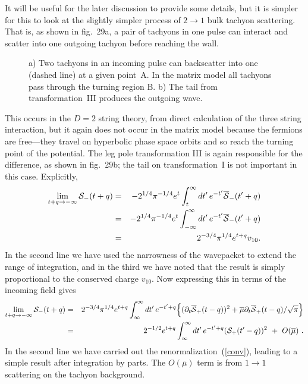 It will be useful for the later discussion to provide some
details, but it is simpler for this to look at the slightly
simpler process of $2 \to 1$ bulk tachyon scattering.
That is, as shown in fig.~29a, a pair of tachyons in one pulse can
interact and scatter into one outgoing tachyon before reaching the
wall.
\begin{figure}
\begin{center}
\leavevmode
{}
\end{center}
\caption[]{a) Two tachyons in an incoming pulse can backscatter into
one (dashed line) at a given point~A.  In the matrix model all
tachyons pass through the turning region B. b) The tail from
transformation~III produces the outgoing wave.}
\end{figure}
This occurs in the $D=2$ string theory, from direct calculation of
the three string interaction, but it again does not occur in the
matrix model because the fermions are free---they travel on
hyperbolic phase space orbits and so reach the turning point of the
potential.  The leg pole transformation III is again responsible
for the difference, as shown in fig.~29b; the tail on
transformation~I is not important in this case.  Explicitly,
\begin{eqnarray}
\lim_{t + q \to -\infty} {\cal S}_{-}(t + q)
&=& -2^{1/4} \pi^{-1/4} e^t \int_{t}^\infty
dt'\, e^{- t'} \overline{\cal S}_{-}(t' + q) \nonumber\\
&=& -2^{1/4} \pi^{-1/4} e^t \int_{-\infty}^\infty
dt'\, e^{- t'} \overline{\cal S}_{-}(t' + q) \nonumber\\
&=& 2^{-3/4} \pi^{1/4} e^{t + q} v_{10}.
\end{eqnarray}
In the second line we have used the narrowness of the wavepacket to
extend the range of integration, and in the third we have noted that
the result is simply proportional to the conserved charge $v_{10}$.
Now expressing this in terms of the incoming field gives
\begin{eqnarray}
\lim_{t + q \to -\infty} {\cal S}_{-}(t + q)
&=& 2^{-3/4} \pi^{1/4} e^{t + q}
\int_{\infty}^\infty dt'\, e^{-t'+q}
\Bigl\{ (\partial_t \overline{\cal
S}_+(t-q))^2 + \overline\mu \partial_t\overline{\cal
S}_+(t-q) / \sqrt{\pi} \Bigr\} \nonumber\\
&=& 2^{-1/2} e^{t + q} \int_{\infty}^\infty dt'\,  e^{-t'+q}
({\cal S}_+(t'-q))^2 \ +\ O(\overline\mu)\ . 
\label{2to1}
\end{eqnarray}
In the second line we have carried out the
renormalization~(\ref{conv}), leading to a simple result
after integration by parts.  The $O(\overline\mu)$ term
is from
$1 \to 1$ scattering on the tachyon background.

